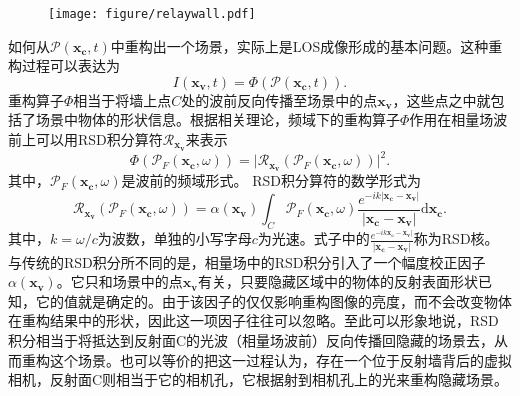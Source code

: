 \documentclass[master]{shtthesis}             %
\begin{document}
\begin{figure}[!tb]
  \centering
  \texttt{[image: figure/relaywall.pdf]}
  \label{fig:rsd_nlos_scene}
\end{figure}

如何从$\mathcal{P}(\mathbf{x_c},t)$中重构出一个场景，实际上是LOS成像形成的基本问题。这种重构过程可以表达为
\begin{equation}\label{eq:recons}
  I(\mathbf{x_v}, t)=\varPhi (\mathcal{P}(\mathbf{x_c},t)).
\end{equation}
重构算子$\varPhi$相当于将墙上点$C$处的波前反向传播至场景中的点$\mathbf{x_v}$，这些点之中就包括了场景中物体的形状信息。根据相关理论\citep{Teichman2019}，频域下的重构算子$\varPhi$作用在相量场波前上可以用RSD积分算符$\mathcal{R}_{\mathbf{x_v}}$来表示
\begin{equation}\label{eq:recons_freq}
  \varPhi \left( \mathcal{P}_F(\mathbf{x_c},\omega) \right) = \Big| \mathcal{R}_{\mathbf{x_v}} \left( \mathcal{P}_F(\mathbf{x_c},\omega) \right) \Big|^2.
\end{equation}
其中，$\mathcal{P}_F(\mathbf{x_c},\omega)$是波前的频域形式。
RSD积分算符的数学形式为
\begin{equation}\label{eq:rsdint}
  \mathcal{R}_{\mathbf{x_v}} \left( \mathcal{P}_F(\mathbf{x_c},\omega) \right) = \alpha(\mathbf{x_v}) \int_C \mathcal{P}_F(\mathbf{x_c},\omega) \frac{e^{-ik|\mathbf{x_c}-\mathbf{x_v}|}}{|\mathbf{x_c}-\mathbf{x_v}|}\text{d} \mathbf{x_c} .
\end{equation}
其中，$k=\omega/c$为波数，单独的小写字母$c$为光速。式子中的$\frac{e^{-ik\mathbf{x_c}-\mathbf{x_v}|}}{|\mathbf{x_c}-\mathbf{x_v}|}$称为RSD核。与传统的RSD积分所不同的是，相量场中的RSD积分引入了一个幅度校正因子$\alpha(\mathbf{x_v})$。它只和场景中的点$\mathbf{x_v}$有关，只要隐藏区域中的物体的反射表面形状已知，它的值就是确定的。由于该因子的仅仅影响重构图像的亮度，而不会改变物体在重构结果中的形状，因此这一项因子往往可以忽略。至此可以形象地说，RSD积分相当于将抵达到反射面C的光波（相量场波前）反向传播回隐藏的场景去，从而重构这个场景。也可以等价的把这一过程认为，存在一个位于反射墙背后的虚拟相机，反射面C则相当于它的相机孔，它根据射到相机孔上的光来重构隐藏场景。
\end{document}
